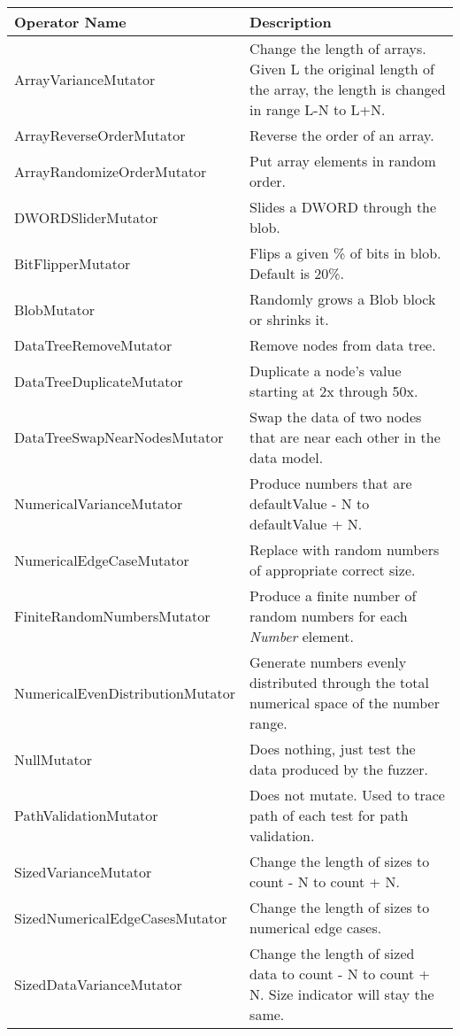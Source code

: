 
\begin{table}[h]
\begin{center}
\footnotesize
\begin{tabular}{|p{5cm}|p{9cm}|}
\hline
\textbf{Operator Name}&\textbf{Description}\\
\hline
ArrayVarianceMutator&Change the length of arrays. Given L the original length of the array, the length is changed in range L-N to L+N.\\
ArrayReverseOrderMutator&Reverse the order of an array.\\
ArrayRandomizeOrderMutator&Put array elements in random order.\\
DWORDSliderMutator&Slides a DWORD through the blob.\\
BitFlipperMutator&Flips a given \% of bits in blob. Default is 20\%.\\
BlobMutator&Randomly grows a Blob block or shrinks it.\\
DataTreeRemoveMutator&Remove nodes from data tree.\\
DataTreeDuplicateMutator&Duplicate a node's value starting at 2x through 50x.\\
DataTreeSwapNearNodesMutator&Swap the data of two nodes that are near each other in the data model.\\
NumericalVarianceMutator&Produce numbers that are defaultValue - N to defaultValue + N.\\
NumericalEdgeCaseMutator&Replace with random numbers of appropriate correct size.\\
FiniteRandomNumbersMutator&Produce a finite number of random numbers for each \emph{Number} element.\\
NumericalEvenDistributionMutator&Generate numbers evenly distributed through the total numerical space of the number range.\\
NullMutator&Does nothing, just test the data produced by the fuzzer.\\
PathValidationMutator&Does not mutate. Used to trace path of each test for path validation.\\
SizedVarianceMutator&Change the length of sizes to count - N to count + N.\\
SizedNumericalEdgeCasesMutator&Change the length of sizes to numerical edge cases.\\
SizedDataVarianceMutator& Change the length of sized data to count - N to count + N. Size indicator will stay the same.\\

\end{tabular}
\end{center}
\end{table}
